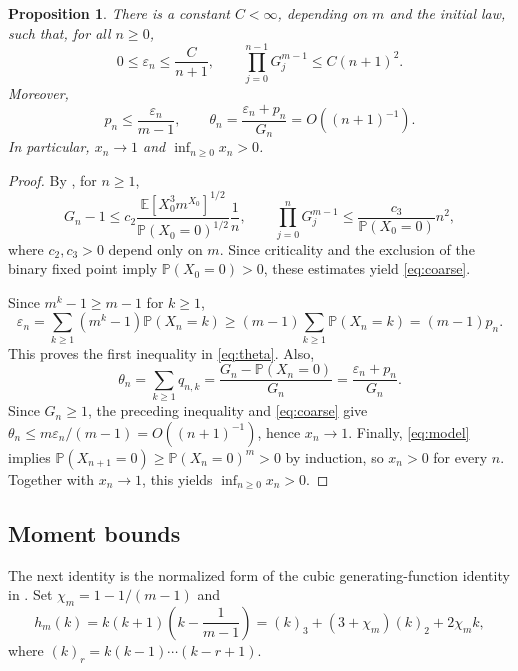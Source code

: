 \documentclass[11pt,letterpaper,reqno]{amsart}
\numberwithin{equation}{section}
\theoremstyle{plain}
\newtheorem{proposition}[theorem]{Proposition}
\theoremstyle{remark}
\newcommand{\E}{\mathbb E}\newcommand{\Pp}{\mathbb P}
\begin{document}
\begin{proposition}\label{prop:coarse}
There is a constant $C<\infty$, depending on $m$ and the initial law, such that, for all $n\ge0$,
\begin{equation}\label{eq:coarse}
 0\le\varepsilon_n\le\frac C{n+1},\qquad
 \prod_{j=0}^{n-1}G_j^{m-1}\le C(n+1)^2.
\end{equation}
Moreover,
\begin{equation}\label{eq:theta}
 p_n\le\frac{\varepsilon_n}{m-1},\qquad
 \theta_n=\frac{\varepsilon_n+p_n}{G_n}=O((n+1)^{-1}).
\end{equation}
In particular, $x_n\to1$ and $\inf_{n\ge0}x_n>0$.
\end{proposition}
\begin{proof}
By \cite[Theorem~3 and Proposition~1]{CDHLS}, for $n\ge1$,
\[
 G_n-1\le c_2\frac{\E[X_0^3m^{X_0}]^{1/2}}{\Pp(X_0=0)^{1/2}}\frac1n,
 \qquad
 \prod_{j=0}^{n}G_j^{m-1}\le\frac{c_3}{\Pp(X_0=0)}n^2,
\]
where $c_2,c_3>0$ depend only on $m$. Since criticality and the exclusion of the binary fixed point imply $\Pp(X_0=0)>0$, these estimates yield \eqref{eq:coarse}.

Since $m^k-1\ge m-1$ for $k\ge1$,
\[
 \varepsilon_n=\sum_{k\ge1}(m^k-1)\Pp(X_n=k)
 \ge(m-1)\sum_{k\ge1}\Pp(X_n=k)=(m-1)p_n.
\]
This proves the first inequality in \eqref{eq:theta}. Also,
\[
 \theta_n=\sum_{k\ge1}q_{n,k}
 =\frac{G_n-\Pp(X_n=0)}{G_n}
 =\frac{\varepsilon_n+p_n}{G_n}.
\]
Since $G_n\ge1$, the preceding inequality and \eqref{eq:coarse} give
$\theta_n\le m\varepsilon_n/(m-1)=O((n+1)^{-1})$, hence $x_n\to1$.
Finally, \eqref{eq:model} implies
$\Pp(X_{n+1}=0)\ge\Pp(X_n=0)^m>0$ by induction, so $x_n>0$ for every $n$. Together with $x_n\to1$, this yields $\inf_{n\ge0}x_n>0$.
\end{proof}

\subsection{Moment bounds}
The next identity is the normalized form of the cubic generating-function identity in \cite[eqs.~(18)--(19)]{CDHLS}. Set $\chi_m=1-1/(m-1)$ and
\begin{equation}\label{eq:cubic}
 h_m(k)=k(k+1)\left(k-\frac1{m-1}\right)
 =(k)_3+(3+\chi_m)(k)_2+2\chi_m k,
\end{equation}
where $(k)_r=k(k-1)\cdots(k-r+1)$.
\end{document}
